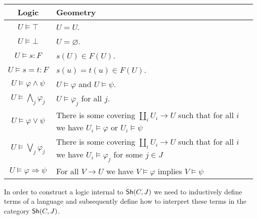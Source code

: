 \begin{center}
	\def\arraystretch{1.5}%

	\begin{tabular}{|c|p{8cm}|}
		\hline
		Logic                               & Geometry                                                                                                             \\
		\hline
		$U \vDash \top$                     & $U = U$.                                                                                                             \\
		$U \vDash \bot$                     & $U = \varnothing$.                                                                                                   \\
		$U \vDash s \colon F$               & $s(U) \in F(U)$.                                                                                                     \\
		$U \vDash s = t \colon F$           & $s(u) = t(u) \in F(U)$.                                                                                              \\
		$U \vDash \varphi \land \psi$       & $U \vDash \varphi$ and $U \vDash \psi$.                                                                              \\
		$U \vDash \bigwedge_{j} \varphi_j$  & $ U \vDash \varphi_j $ for all $j$.                                                                                  \\
		$U \vDash \varphi \vee \psi$        & There is some covering $\coprod_i U_i \to U$ such that for all $i$ we have $U_i \vDash \varphi$ or $U_i \vDash \psi$ \\
		$U \vDash \bigvee_{j} \varphi_j$    & There is some covering $\coprod_i U_i \to U$ such that for all $i$ we have $U_i \vDash \varphi_j$ for some $j \in J$ \\
		$U \vDash \varphi \Rightarrow \psi$ & For all  $V \to U$ we have $V \vDash \varphi$ implies $V \vDash \psi$                                                \\
		\hline
	\end{tabular}
\end{center}

In order to construct a logic internal to $\operatorname{\mathsf{Sh}}(C,J)$ we need to inductively define terms of a language and subsequently define how to interpret these terms in the category $\operatorname{\mathsf{Sh}}(C,J)$.

